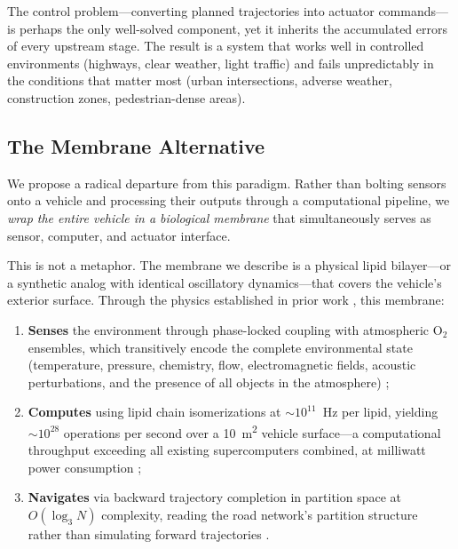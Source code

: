 \documentclass[twocolumn,10pt]{article}
\theoremstyle{definition}
\theoremstyle{remark}
\begin{document}
The control problem---converting planned trajectories into actuator commands---is perhaps the only well-solved component, yet it inherits the accumulated errors of every upstream stage. The result is a system that works well in controlled environments (highways, clear weather, light traffic) and fails unpredictably in the conditions that matter most (urban intersections, adverse weather, construction zones, pedestrian-dense areas).

\subsection{The Membrane Alternative}

We propose a radical departure from this paradigm. Rather than bolting sensors onto a vehicle and processing their outputs through a computational pipeline, we \emph{wrap the entire vehicle in a biological membrane} that simultaneously serves as sensor, computer, and actuator interface.

This is not a metaphor. The membrane we describe is a physical lipid bilayer---or a synthetic analog with identical oscillatory dynamics---that covers the vehicle's exterior surface. Through the physics established in prior work \cite{sachikonye2025membrane, sachikonye2026lipid, sachikonye2025cpu, sachikonye2025circuits}, this membrane:

\begin{enumerate}[label=(\roman*)]
  \item \textbf{Senses} the environment through phase-locked coupling with atmospheric $\mathrm{O}_2$ ensembles, which transitively encode the complete environmental state (temperature, pressure, chemistry, flow, electromagnetic fields, acoustic perturbations, and the presence of all objects in the atmosphere) \cite{sachikonye2026atmospheric, sachikonye2026gas};
  \item \textbf{Computes} using lipid chain isomerizations at $\sim 10^{11}$~Hz per lipid, yielding $\sim 10^{28}$ operations per second over a \SI{10}{m^2} vehicle surface---a computational throughput exceeding all existing supercomputers combined, at milliwatt power consumption \cite{sachikonye2025cpu, sachikonye2025circuits};
  \item \textbf{Navigates} via backward trajectory completion in partition space at $O(\log_3 N)$ complexity, reading the road network's partition structure rather than simulating forward trajectories \cite{sachikonye2026backward, sachikonye2026trajectory}.
\end{enumerate}
\end{document}
